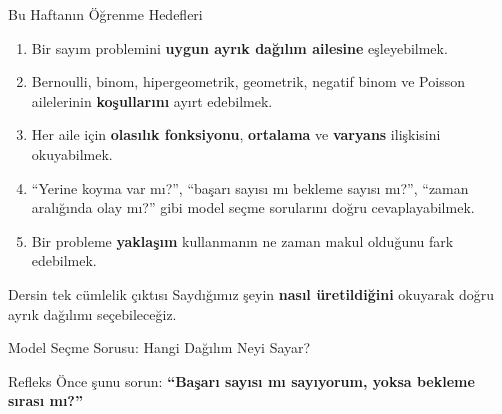 \documentclass[light]{lutbeamer}
\begin{document}
\begin{frame}{Bu Haftanın Öğrenme Hedefleri}
    \small
    \begin{enumerate}
        \item Bir sayım problemini \textbf{uygun ayrık dağılım ailesine} eşleyebilmek.
        \item Bernoulli, binom, hipergeometrik, geometrik, negatif binom ve Poisson ailelerinin \textbf{koşullarını} ayırt edebilmek.
        \item Her aile için \textbf{olasılık fonksiyonu}, \textbf{ortalama} ve \textbf{varyans} ilişkisini okuyabilmek.
        \item ``Yerine koyma var mı?'', ``başarı sayısı mı bekleme sayısı mı?'', ``zaman aralığında olay mı?'' gibi model seçme sorularını doğru cevaplayabilmek.
        \item Bir probleme \textbf{yaklaşım} kullanmanın ne zaman makul olduğunu fark edebilmek.
    \end{enumerate}

    \begin{exampleblock}{Dersin tek cümlelik çıktısı}
        Saydığımız şeyin \textbf{nasıl üretildiğini} okuyarak doğru ayrık dağılımı seçebileceğiz.
    \end{exampleblock}
\end{frame}

\begin{frame}{Model Seçme Sorusu: Hangi Dağılım Neyi Sayar?}
    \scriptsize
    \begin{center}
    \end{center}

    \begin{alertblock}{Refleks}
        Önce şunu sorun:
        \textbf{``Başarı sayısı mı sayıyorum, yoksa bekleme sırası mı?''}
    \end{alertblock}
\end{frame}
\end{document}

